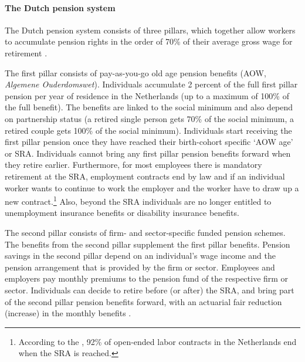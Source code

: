 \documentclass[12pt,a4paper]{article}
\begin{document}
\paragraph{The Dutch pension system} 
The Dutch pension system consists of three pillars, which together allow workers to accumulate pension rights in the order of 70\% of their average gross wage for retirement \citep{knoef_et_al_2017}. 

The first pillar consists of pay-as-you-go old age pension benefits (AOW, \textit{Algemene Ouderdomswet}). Individuals accumulate 2 percent of the full first pillar pension per year of residence in the Netherlands (up to a maximum of 100\% of the full benefit). The benefits are linked to the social minimum and also depend on partnership status (a retired single person gets 70\% of the social minimum, a retired couple gets 100\% of the social minimum). Individuals start receiving the first pillar pension once they have reached their birth-cohort specific `AOW age' or SRA. 
Individuals cannot bring any first pillar pension benefits forward when they retire earlier. Furthermore, for most employees there is mandatory retirement at the SRA, employment contracts end by law and if an individual worker wants to continue to work the employer and the worker have to draw up a new contract.\footnote{According to the \citet[][p. 94]{oecd_2014}, 92\% of open-ended labor contracts in the Netherlands end when the SRA is reached.} Also, beyond the SRA individuals are no longer entitled to unemployment insurance benefits or disability insurance benefits.

The second pillar consists of firm- and sector-specific 
funded pension schemes. The benefits from the second pillar supplement the first pillar benefits. Pension savings in the second pillar depend on an individual's wage income and the pension arrangement that is provided by the firm or sector. Employees and employers pay monthly premiums to the pension fund of the respective firm or sector. 
Individuals can decide to retire before (or after) the SRA, and bring part of the second pillar pension benefits forward, with an actuarial fair reduction (increase) in the monthly benefits \citep{de_vos_social_2019}.
\end{document}
